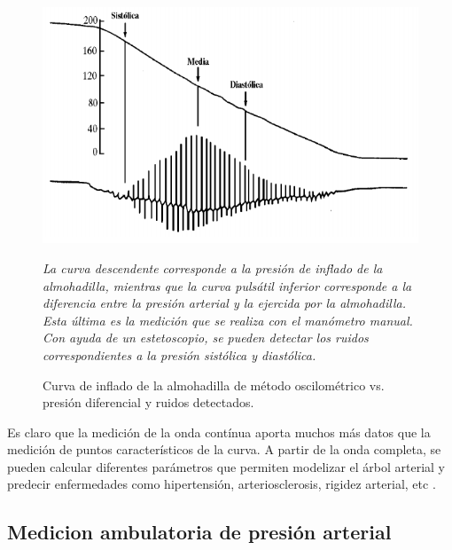 \begin{figure}[!htbp]
	\centering
	\begin{minipage}{0.65\textwidth}
		\includegraphics[width=\textwidth]{./Figures/moscilometrico.png}
		{\footnotesize \textit{La curva descendente corresponde a la presión de inflado de la almohadilla, mientras que la 	curva pulsátil inferior corresponde a la diferencia entre la presión arterial y la ejercida por la almohadilla. Esta última es la medición que se realiza con el manómetro manual. Con ayuda de un estetoscopio, se pueden detectar los ruidos correspondientes a la presión sistólica y diastólica.}\par}		
	\end{minipage}	
	
	\caption{Curva de inflado de la almohadilla de método oscilométrico vs. presión diferencial y ruidos detectados.}
	\label{fig:moscilometrico}
\end{figure}

Es claro que la medición de la onda contínua aporta muchos más datos que la medición de puntos característicos de la curva. A partir de la onda completa, se pueden calcular diferentes parámetros que permiten modelizar el árbol arterial y predecir enfermedades como hipertensión, arteriosclerosis, rigidez arterial, etc \citep{saito2011}  \citep{figueroa2014}.


\subsection{Medicion ambulatoria de presión arterial}

